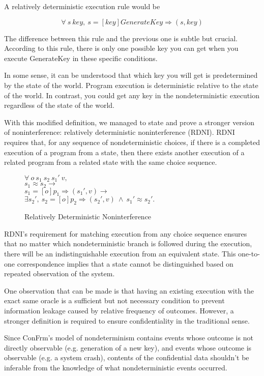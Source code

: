 A relatively deterministic execution rule would be

$$\forall\ s\ key,\ s  =[key]GenerateKey\Rightarrow (s, key)$$ 

The difference between this rule and the previous one is subtle but crucial. 
According to this rule, there is only one possible key you can get when you execute GenerateKey in these specific conditions.

In some sense, it can be understood that which key you will get is predetermined by the state of the world. Program execution is deterministic relative to the state of the world.
In contrast, you could get any key in the nondeterministic execution regardless of the state of the world.

With this modified definition, we managed to state and prove a stronger version of noninterference: relatively deterministic noninterference (RDNI). RDNI requires that, for any sequence of nondeterministic choices, if there is a completed execution of a program from a state, then there exists another execution of a related program from a related state with the same choice sequence.

\begin{figure}[H]
	$\forall\ o\ s_1\ s_2\ s_1'\ v,$\\
	$s_1\approx s_2 \rightarrow$\\
	$s_1 =[o]p_1\Rightarrow (s_1', v) \rightarrow$\\
	$\exists s_2',\ s_2 =[o]p_2\Rightarrow (s_2', v)\ \wedge\ s_1'\approx s_2'.$\\
	\caption{Relatively Deterministic Noninterference}
\end{figure}

RDNI's requirement for matching execution from any choice sequence ensures that no matter which nondeterministic branch is followed during the execution, there will be an indistinguishable execution from an equivalent state. This one-to-one correspondence implies that a state cannot be distinguished based on repeated observation of the system.

One observation that can be made is that having an existing execution with the exact same oracle is a sufficient but not necessary condition to prevent information leakage caused by relative frequency of outcomes. However, a stronger definition is required to ensure confidentiality in the traditional sense. 

Since ConFrm’s model of nondeterminism contains events whose outcome is not directly observable (e.g. generation of a new key), and events whose outcome is observable (e.g. a system crash), contents of the confidential data shouldn’t be inferable from the knowledge of what nondeterministic events occurred. 

